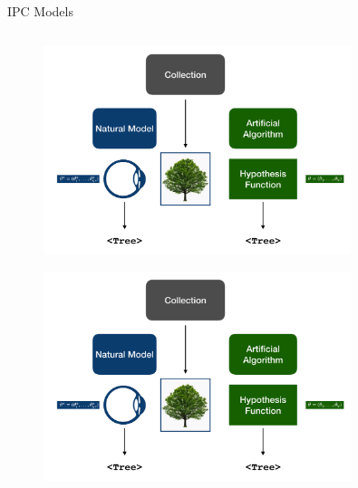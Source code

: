 \documentclass{beamer}
\begin{document}
\begin{frame}{IPC Models}
\begin{columns}
			\begin{column}{0.35\textwidth}
				\begin{figure}
					\includegraphics[width=0.8\textwidth,height=0.7\textwidth]{Pics/learning-algorithm.png}
				\end{figure}
				\begin{figure}
					\includegraphics[width=0.8\textwidth,height=0.7\textwidth]{Pics/learning-algorithm.png}
				\end{figure}
			\end{column}
		\end{columns}
	
	\end{frame}
\end{document}
